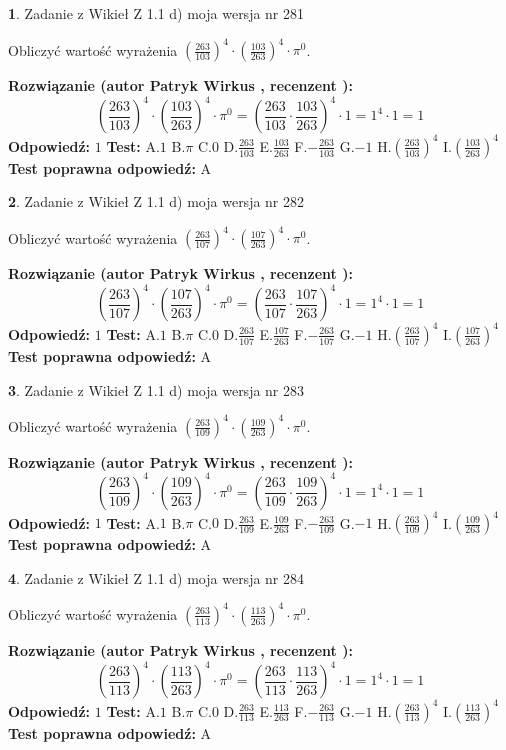 \documentclass[12pt, a4paper]{article}
\theoremstyle{definition} %
\newtheorem{zad}{}
\newcommand{\zadStart}[1]{\begin{zad}#1\newline}
\newcommand{\zadStop}{\end{zad}}
\newcommand{\rozwStart}[2]{\noindent \textbf{Rozwiązanie (autor #1 , recenzent #2): }\newline}
\newcommand{\rozwStop}{\newline}
\newcommand{\odpStart}{\noindent \textbf{Odpowiedź:}\newline}
\newcommand{\odpStop}{\newline}
\newcommand{\testStart}{\noindent \textbf{Test:}\newline}
\newcommand{\testStop}{\newline}
\newcommand{\kluczStart}{\noindent \textbf{Test poprawna odpowiedź:}\newline}
\newcommand{\kluczStop}{\newline}
\begin{document}
\zadStart{Zadanie z Wikieł Z 1.1 d) moja wersja nr 281}

Obliczyć wartość wyrażenia $(\frac{263}{103})^{4} \cdot (\frac{103}{263})^{4} \cdot \pi^{0}$.
\zadStop
\rozwStart{Patryk Wirkus}{}
$$(\frac{263}{103})^{4} \cdot (\frac{103}{263})^{4} \cdot \pi^{0} = (\frac{263}{103} \cdot \frac{103}{263})^{4} \cdot 1 = 1^{4} \cdot 1 = 1$$
\rozwStop
\odpStart
$1$
\odpStop
\testStart
A.$1$ B.$\pi$ C.$0$ D.$\frac{263}{103}$ E.$\frac{103}{263}$
F.$-\frac{263}{103}$ G.$-1$
H.$(\frac{263}{103})^{4}$
I.$(\frac{103}{263})^{4}$
\testStop
\kluczStart
A
\kluczStop



\zadStart{Zadanie z Wikieł Z 1.1 d) moja wersja nr 282}

Obliczyć wartość wyrażenia $(\frac{263}{107})^{4} \cdot (\frac{107}{263})^{4} \cdot \pi^{0}$.
\zadStop
\rozwStart{Patryk Wirkus}{}
$$(\frac{263}{107})^{4} \cdot (\frac{107}{263})^{4} \cdot \pi^{0} = (\frac{263}{107} \cdot \frac{107}{263})^{4} \cdot 1 = 1^{4} \cdot 1 = 1$$
\rozwStop
\odpStart
$1$
\odpStop
\testStart
A.$1$ B.$\pi$ C.$0$ D.$\frac{263}{107}$ E.$\frac{107}{263}$
F.$-\frac{263}{107}$ G.$-1$
H.$(\frac{263}{107})^{4}$
I.$(\frac{107}{263})^{4}$
\testStop
\kluczStart
A
\kluczStop



\zadStart{Zadanie z Wikieł Z 1.1 d) moja wersja nr 283}

Obliczyć wartość wyrażenia $(\frac{263}{109})^{4} \cdot (\frac{109}{263})^{4} \cdot \pi^{0}$.
\zadStop
\rozwStart{Patryk Wirkus}{}
$$(\frac{263}{109})^{4} \cdot (\frac{109}{263})^{4} \cdot \pi^{0} = (\frac{263}{109} \cdot \frac{109}{263})^{4} \cdot 1 = 1^{4} \cdot 1 = 1$$
\rozwStop
\odpStart
$1$
\odpStop
\testStart
A.$1$ B.$\pi$ C.$0$ D.$\frac{263}{109}$ E.$\frac{109}{263}$
F.$-\frac{263}{109}$ G.$-1$
H.$(\frac{263}{109})^{4}$
I.$(\frac{109}{263})^{4}$
\testStop
\kluczStart
A
\kluczStop



\zadStart{Zadanie z Wikieł Z 1.1 d) moja wersja nr 284}

Obliczyć wartość wyrażenia $(\frac{263}{113})^{4} \cdot (\frac{113}{263})^{4} \cdot \pi^{0}$.
\zadStop
\rozwStart{Patryk Wirkus}{}
$$(\frac{263}{113})^{4} \cdot (\frac{113}{263})^{4} \cdot \pi^{0} = (\frac{263}{113} \cdot \frac{113}{263})^{4} \cdot 1 = 1^{4} \cdot 1 = 1$$
\rozwStop
\odpStart
$1$
\odpStop
\testStart
A.$1$ B.$\pi$ C.$0$ D.$\frac{263}{113}$ E.$\frac{113}{263}$
F.$-\frac{263}{113}$ G.$-1$
H.$(\frac{263}{113})^{4}$
I.$(\frac{113}{263})^{4}$
\testStop
\kluczStart
A
\kluczStop
\end{document}
